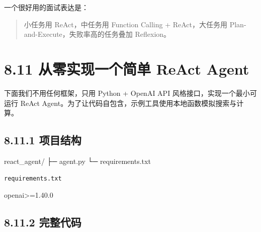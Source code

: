 一个很好用的面试表达是：


\begin{quote}
小任务用 ReAct，中任务用 Function Calling + ReAct，大任务用 Plan-and-Execute，失败率高的任务叠加 Reflexion。\\
\end{quote}

\section{8.11 从零实现一个简单 ReAct Agent}

下面我们不用任何框架，只用 Python + OpenAI API 风格接口，实现一个最小可运行 ReAct Agent。为了让代码自包含，示例工具使用本地函数模拟搜索与计算。


\subsection{8.11.1 项目结构}

\begin{codeblock}
react_agent/
├─ agent.py
└─ requirements.txt
\end{codeblock}

\texttt{requirements.txt}


\begin{codeblock}
openai>=1.40.0
\end{codeblock}

\subsection{8.11.2 完整代码}

